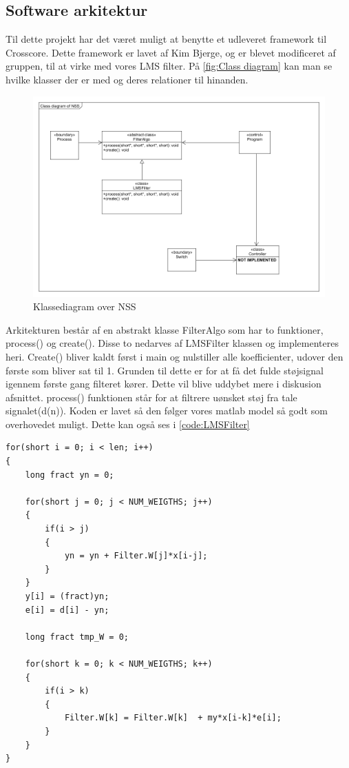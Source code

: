 \newpage

\subsection{Software arkitektur}
Til dette projekt har det været muligt at benytte et udleveret framework til Crosscore. Dette framework er lavet af Kim Bjerge, og er blevet modificeret af gruppen, til at virke med vores LMS filter. På \autoref{fig:Class diagram} kan man se hvilke klasser der er med og deres relationer til hinanden. 


\begin{figure}[H]
	\centering
	\includegraphics[width = 400pt]{Img/ClassDiagram.png}
	\caption{Klassediagram over NSS}
	\label{fig:Class diagram}
\end{figure}

Arkitekturen består af en abstrakt klasse FilterAlgo som har to funktioner, process() og create(). Disse to nedarves af LMSFilter klassen og implementeres heri. Create() bliver kaldt først i main og nulstiller alle koefficienter, udover den første som bliver sat til 1. Grunden til dette er for at få det fulde støjsignal igennem første gang filteret kører. Dette vil blive uddybet mere i diskusion afsnittet. process() funktionen står for at filtrere uønsket støj fra tale signalet(d(n)). Koden er lavet så den følger vores matlab model så godt som overhovedet muligt. Dette kan også ses i \autoref{code:LMSFilter}

\newpage


\begin{lstlisting}
for(short i = 0; i < len; i++)
{
	long fract yn = 0;

	for(short j = 0; j < NUM_WEIGTHS; j++)
	{
		if(i > j)
		{
			yn = yn + Filter.W[j]*x[i-j];
		}
	}
	y[i] = (fract)yn;
	e[i] = d[i] - yn;
		
	long fract tmp_W = 0;
		
	for(short k = 0; k < NUM_WEIGTHS; k++)
	{
		if(i > k)
		{
			Filter.W[k] = Filter.W[k]  + my*x[i-k]*e[i];
		}
	}
}
\end{lstlisting}
\label{code:LMSFilter}

